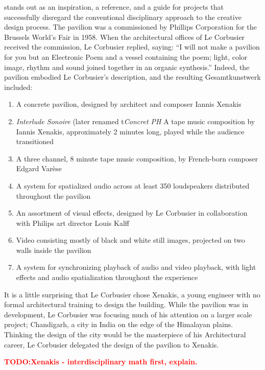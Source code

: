 \documentclass{tufte-book}
\newcommand{\TODO}[1]{\textcolor{red}{\bf TODO:#1}\xspace}
\begin{document}
 stands out as an inspiration, a
reference, and a guide for projects that successfully disregard the
conventional disciplinary approach to the creative design process. The
pavilion was a commissioned by Phillips Corporation for the Brussels
World's Fair in 1958.\cite{Zvonar1999} When the architectural offices of
Le Corbusier received the commission, Le Corbusier replied, saying:
``I will not make a pavilion for you but an Electronic Poem and a
vessel containing the poem; light, color image, rhythm and sound
joined together in an organic synthesis.''\cite{Lopez2011} Indeed,
the pavilion embodied Le Corbusier's description, and the resulting
Gesamtkunstwerk included:\cite{Lombardo2009}
\begin{enumerate}
\item A concrete pavilion, designed by architect and composer Iannis
  Xenakis
\item \textit{Interlude Sonoire} (later renamed t\textit{Concret PH} A
  tape music composition by Iannis Xenakis, approximately 2 minutes
  long, played while the audience transitioned
\item A three channel, 8 minute tape music composition, by French-born
  composer Edgard Var\`{e}se
\item A system for spatialized audio across at least 350 loudspeakers
  distributed throughout the pavilion
\item An assortment of visual effects, designed by Le Corbusier in
  collaboration with Philips art director Louis Kalff
\item Video consisting mostly of black and white still images,
  projected on two walls inside the pavilion
\item A system for synchronizing playback of audio and video playback,
  with light effects and audio spatialization throughout the
  experience
\end{enumerate} 

It is a little surprising that Le Corbusier chose Xenakis, a young
engineer with no formal architectural training to design
the building. While the pavilion was in development, Le Corbusier was
focusing much of his attention on a larger scale project; Chandigarh,
a city in India on the edge of the Himalayan plains. Thinking the
design of the city would be the masterpiece of his Architectural
career,\cite{Flint2013} Le Corbusier delegated the design of the
pavilion to Xenakis.\cite{Clarke2012}

\TODO{Xenakis - interdisciplinary math first, explain. }
\end{document}
